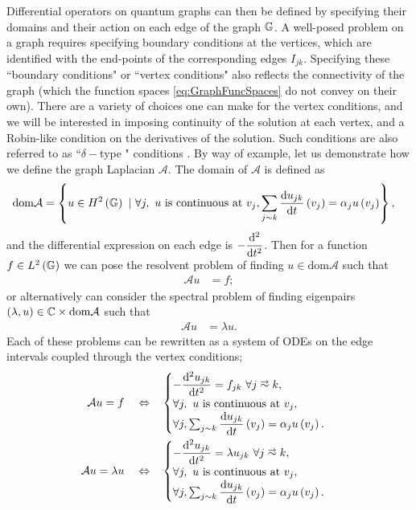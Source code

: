 Differential operators on quantum graphs can then be defined by specifying their domains and their action on each edge of the graph $\mathbb{G}$.
A well-posed problem on a graph requires specifying boundary conditions at the vertices, which are identified with the end-points of the corresponding edges $I_{jk}$.
Specifying these ``boundary conditions" or ``vertex conditions" also reflects the connectivity of the graph (which the function spaces \eqref{eq:GraphFuncSpaces} do not convey on their own).
There are a variety of choices one can make for the vertex conditions, and we will be interested in imposing continuity of the solution at each vertex, and a Robin-like condition on the derivatives of the solution.
Such conditions are also referred to as ``$\delta-$type " conditions .
By way of example, let us demonstrate how we define the graph Laplacian $\mathcal{A}$.
The domain of $\mathcal{A}$ is defined as
\begin{align*}
	\mathrm{dom}\mathcal{A} &= \clbracs{ u\in H^2\bracs{\graph} \ \vert \ \forall j, \ u \text{ is continuous at } v_j, \sum_{j\con k}\diff{u_{jk}}{t}\bracs{v_j} = \alpha_j u\bracs{v_j} },
\end{align*}
and the differential expression on each edge is $-\dfrac{\mathrm{d}^2 }{\mathrm{d} {t}^2}$.
Then for a function $f\in L^2\left( \mathbb{G} \right)$ we can pose the resolvent problem of finding $u\in\mathrm{dom}\mathcal{A}$ such that
\begin{align*}
	\mathcal{A}u &= f;
\end{align*}
or alternatively can consider the spectral problem of finding eigenpairs $\left( \lambda,u \right)\in\mathbb{C}\times\mathrm{dom}\mathcal{A}$ such that
\begin{align*}
	\mathcal{A}u &= \lambda u.
\end{align*}
Each of these problems can be rewritten as a system of ODEs on the edge intervals coupled through the vertex conditions;
\begin{align*}
	\mathcal{A}u = f \quad\Leftrightarrow\quad &
	\begin{cases}
		-\ddiff{u_{jk}}{t} = f_{jk} \ \forall j\conLeft k, \\
		\forall j, \ u \text{ is continuous at } v_j, \\
		\forall j, \sum_{j\con k}\diff{u_{jk}}{t}\bracs{v_j} = \alpha_j u\bracs{v_j}.
	\end{cases} \\
	\mathcal{A}u = \lambda u \quad\Leftrightarrow\quad &
	\begin{cases}
		-\ddiff{u_{jk}}{t} = \lambda u_{jk} \ \forall j\conLeft k, \\
		\forall j, \ u \text{ is continuous at } v_j, \\
		\forall j, \sum_{j\con k}\diff{u_{jk}}{t}\bracs{v_j} = \alpha_j u\bracs{v_j}.
	\end{cases}
\end{align*}

